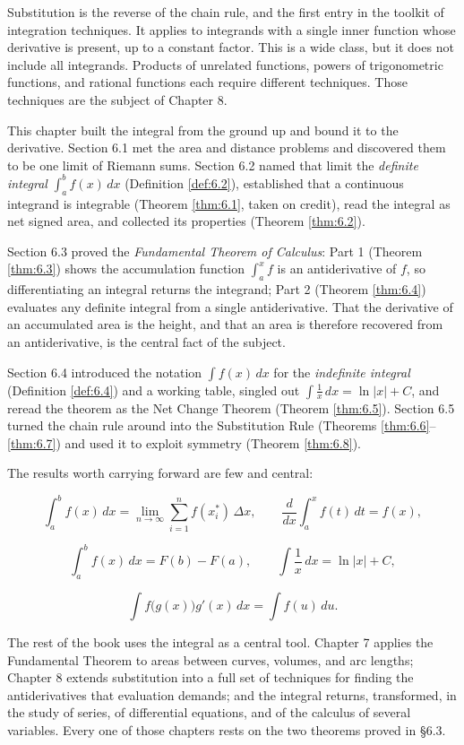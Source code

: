 \documentclass[a4paper,12pt,oneside]{memoir}
\begin{document}
Substitution is the reverse of the chain rule, and the first entry in the toolkit of integration techniques. It applies to integrands with a single inner function whose derivative is present, up to a constant factor. This is a wide class, but it does not include all integrands. Products of unrelated functions, powers of trigonometric functions, and rational functions each require different techniques. Those techniques are the subject of Chapter 8.

This chapter built the integral from the ground up and bound it to the derivative. Section 6.1 met the area and distance problems and discovered them to be one limit of Riemann sums. Section 6.2 named that limit the \emph{definite integral} \(\int_{a}^{b} f(x)\,dx\) (Definition \ref{def:6.2}), established that a continuous integrand is integrable (Theorem \ref{thm:6.1}, taken on credit), read the integral as net signed area, and collected its properties (Theorem \ref{thm:6.2}).

Section 6.3 proved the \emph{Fundamental Theorem of Calculus}: Part 1 (Theorem \ref{thm:6.3}) shows the accumulation function \(\int_{a}^{x} f\) is an antiderivative of \(f\), so differentiating an integral returns the integrand; Part 2 (Theorem \ref{thm:6.4}) evaluates any definite integral from a single antiderivative. That the derivative of an accumulated area is the height, and that an area is therefore recovered from an antiderivative, is the central fact of the subject.

Section 6.4 introduced the notation \(\int f(x)\,dx\) for the \emph{indefinite integral} (Definition \ref{def:6.4}) and a working table, singled out \(\int \tfrac{1}{x}\,dx = \ln\lvert x\rvert + C\), and reread the theorem as the Net Change Theorem (Theorem \ref{thm:6.5}). Section 6.5 turned the chain rule around into the Substitution Rule (Theorems \ref{thm:6.6}–\ref{thm:6.7}) and used it to exploit symmetry (Theorem \ref{thm:6.8}).

The results worth carrying forward are few and central:

\[ \int_{a}^{b} f(x)\,dx = \lim_{n \to \infty} \sum_{i=1}^{n} f(x_{i}^{*})\,\Delta x, \qquad \frac{d}{dx}\int_{a}^{x} f(t)\,dt = f(x), \]

\[ \int_{a}^{b} f(x)\,dx = F(b) - F(a), \qquad \int \frac{1}{x}\,dx = \ln\lvert x\rvert + C, \]

\[ \int f\bigl(g(x)\bigr)g'(x)\,dx = \int f(u)\,du. \]

The rest of the book uses the integral as a central tool. Chapter 7 applies the Fundamental Theorem to areas between curves, volumes, and arc lengths; Chapter 8 extends substitution into a full set of techniques for finding the antiderivatives that evaluation demands; and the integral returns, transformed, in the study of series, of differential equations, and of the calculus of several variables. Every one of those chapters rests on the two theorems proved in §6.3.
\end{document}
